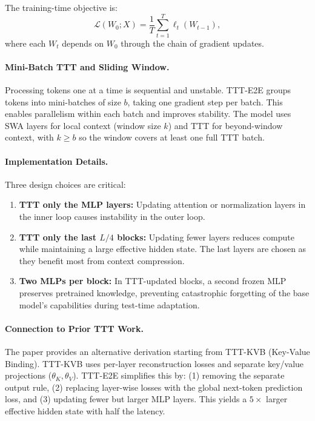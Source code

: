 \documentclass[12pt]{article}
\begin{document}
The training-time objective is:
\[
		\mathcal{L}(W_0; X) = \frac{1}{T} \sum_{t=1}^{T} \ell_t(W_{t-1}),
\]
where each $W_t$ depends on $W_0$ through the chain of gradient updates.

\paragraph{Mini-Batch TTT and Sliding Window.}
Processing tokens one at a time is sequential and unstable. TTT-E2E groups
tokens into mini-batches of size $b$, taking one gradient step per batch.
This enables parallelism within each batch and improves stability. The model
uses SWA layers for local context (window size $k$) and TTT for beyond-window
context, with $k \geq b$ so the window covers at least one full TTT batch.

\paragraph{Implementation Details.}
Three design choices are critical:

\begin{enumerate}
		\item \textbf{TTT only the MLP layers:} Updating attention or normalization
				layers in the inner loop causes instability in the outer loop.
		\item \textbf{TTT only the last $L/4$ blocks:} Updating fewer layers reduces
				compute while maintaining a large effective hidden state. The last
				layers are chosen as they benefit most from context compression.
		\item \textbf{Two MLPs per block:} In TTT-updated blocks, a second frozen
				MLP preserves pretrained knowledge, preventing catastrophic forgetting
				of the base model's capabilities during test-time adaptation.
\end{enumerate}

\paragraph{Connection to Prior TTT Work.}
The paper provides an alternative derivation starting from TTT-KVB (Key-Value
Binding). TTT-KVB uses per-layer reconstruction losses and separate key/value
projections ($\theta_K, \theta_V$). TTT-E2E simplifies this by: (1) removing
the separate output rule, (2) replacing layer-wise losses with the global
next-token prediction loss, and (3) updating fewer but larger MLP layers.
This yields a $5\times$ larger effective hidden state with half the latency.
\end{document}
